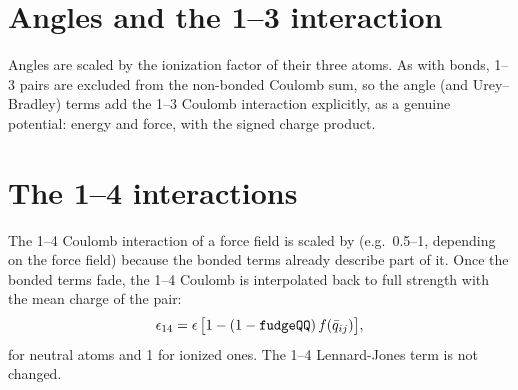 \section{Angles and the 1--3 interaction}

Angles are scaled by the ionization factor of their three atoms.
As with bonds, 1--3 pairs are excluded from the non-bonded Coulomb sum, so the angle (and Urey--Bradley) terms add
the 1--3 Coulomb interaction explicitly, as a genuine potential: energy and force, with the signed charge product.

\section{The 1--4 interactions}

The 1--4 Coulomb interaction of a force field is scaled by  (e.g.\ 0.5--1, depending on the force
field) because the bonded terms already describe part of it.
Once the bonded terms fade, the 1--4 Coulomb is interpolated back to full strength with the mean charge of the pair:
\begin{equation}
  \epsilon_{14} = \epsilon\,\big[1 - (1-\texttt{fudgeQQ})\,f(\bar q_{ij})\big],
\end{equation}
 for neutral atoms and 1 for ionized ones.
The 1--4 Lennard-Jones term is not changed.
